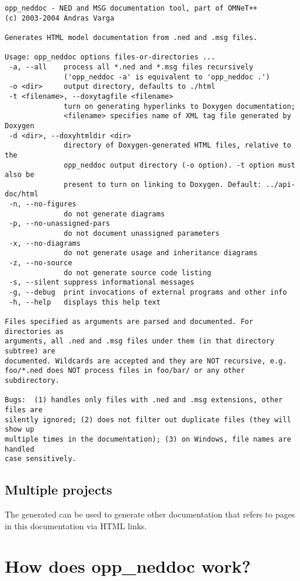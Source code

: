 \begin{verbatim}
opp_neddoc - NED and MSG documentation tool, part of OMNeT++
(c) 2003-2004 Andras Varga

Generates HTML model documentation from .ned and .msg files.

Usage: opp_neddoc options files-or-directories ...
 -a, --all    process all *.ned and *.msg files recursively
              ('opp_neddoc -a' is equivalent to 'opp_neddoc .')
 -o <dir>     output directory, defaults to ./html
 -t <filename>, --doxytagfile <filename>
              turn on generating hyperlinks to Doxygen documentation;
              <filename> specifies name of XML tag file generated by Doxygen
 -d <dir>, --doxyhtmldir <dir>
              directory of Doxygen-generated HTML files, relative to the
              opp_neddoc output directory (-o option). -t option must also be
              present to turn on linking to Doxygen. Default: ../api-doc/html
 -n, --no-figures
              do not generate diagrams
 -p, --no-unassigned-pars
              do not document unassigned parameters
 -x, --no-diagrams
              do not generate usage and inheritance diagrams
 -z, --no-source
              do not generate source code listing
 -s, --silent suppress informational messages
 -g, --debug  print invocations of external programs and other info
 -h, --help   displays this help text

Files specified as arguments are parsed and documented. For directories as
arguments, all .ned and .msg files under them (in that directory subtree) are
documented. Wildcards are accepted and they are NOT recursive, e.g.
foo/*.ned does NOT process files in foo/bar/ or any other subdirectory.

Bugs:  (1) handles only files with .ned and .msg extensions, other files are
silently ignored; (2) does not filter out duplicate files (they will show up
multiple times in the documentation); (3) on Windows, file names are handled
case sensitively.
\end{verbatim}


\subsection{Multiple projects}

The generated  can be used to generate other documentation
that refers to pages in this documentation via HTML links.


\section{How does opp\_neddoc work?}

